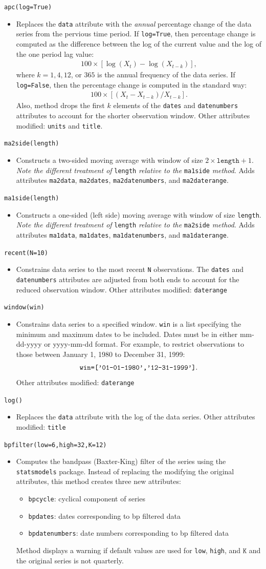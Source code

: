 \documentclass[11pt,fleqn]{article}
\newcommand{\EE}{\begin{eqnarray}}
\newcommand{\FF}{\end{eqnarray}}
\newcommand{\IZ}{\begin{itemize}}
\newcommand{\ZI}{\end{itemize}}
\newcommand{\itemb}{\item[]}
\newcommand{\ttt}{\texttt}
\begin{document}
	\itemb \ttt{apc(log=True)}
		\IZ
		\itemb Replaces the \ttt{data} attribute with the \emph{annual} percentage change of the data series from the pervious time period. If \ttt{log=True}, then percentage change is computed as the difference between the log of the current value and the log of the one period lag value:
			\EE
			100 \times \left[\log(X_t) - \log(X_{t-k})\right],
			\FF
		where $k=1,4,12$, or $365$ is the annual frequency of the data series. If \ttt{log=False}, then the percentage change is computed in the standard way:
			\EE
			100 \times \left[(X_t - X_{t-k})/X_{t-k}\right].
			\FF
		Also, method drops the first $k$ elements of the \ttt{dates} and \ttt{datenumbers} attributes to account for the shorter observation window. Other attributes modified: \ttt{units} and \ttt{title}.
		\ZI
	
	\itemb \ttt{ma2side(length)}
		\IZ
		\itemb Constructs a two-sided moving average with window of size $2\times\ttt{length}+1$. \emph{Note the different treatment of} \ttt{length} \emph{relative to the} \ttt{ma1side} \emph{method}. Adds attributes \ttt{ma2data}, \ttt{ma2dates}, \ttt{ma2datenumbers}, and \ttt{ma2daterange}.
		\ZI
		
	\itemb \ttt{ma1side(length)}
		\IZ
		\itemb Constructs a one-sided (left side) moving average with window of size \ttt{length}. \emph{Note the different treatment of} \ttt{length} \emph{relative to the} \ttt{ma2side} \emph{method}. Adds attributes \ttt{ma1data}, \ttt{ma1dates}, \ttt{ma1datenumbers}, and \ttt{ma1daterange}.
		\ZI
		
	\itemb \ttt{recent(N=10)}
		\IZ
		\itemb Constrains data series to the most recent \ttt{N} observations. The \ttt{dates} and \ttt{datenumbers} attributes are adjusted from both ends to account for the reduced observation window. Other attributes modified: \ttt{daterange}
		\ZI
		
	\itemb \ttt{window(win)}
		\IZ
		\itemb Constrains data series to a specified window. \ttt{win} is a list specifying the minimum and maximum dates to be included. Dates must be in either mm-dd-yyyy or yyyy-mm-dd format. For example, to restrict observations to those between January 1, 1980 to December 31, 1999:
			\EE
			\verb!win=['01-01-1980','12-31-1999']!.
			\FF
		Other attributes modified: \ttt{daterange}
		\ZI
		
	\itemb \ttt{log()}
		\IZ
		\itemb Replaces the \ttt{data} attribute with the log of the data series. Other attributes modified: \ttt{title}
		\ZI
		
	\itemb \ttt{bpfilter(low=6,high=32,K=12)}
		\IZ
		\itemb Computes the bandpass (Baxter-King) filter of the series using the \ttt{statsmodels} package. Instead of replacing the modifying the original attributes, this method creates three new attributes:
			\IZ
            \itemb \ttt{bpcycle}: cyclical component of series
            \itemb \ttt{bpdates}: dates corresponding to bp filtered data
            \itemb \ttt{bpdatenumbers}: date numbers corresponding to bp filtered data
            \ZI
       Method displays a warning if default values are used for \ttt{low}, \ttt{high}, and $\ttt{K}$ and the original series is not quarterly.
		\ZI
	
\end{document}
